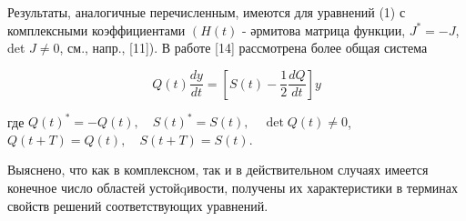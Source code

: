 \documentclass[10pt]{article}
\begin{document}
Результаты, аналогичные перечисленным, имеются для уравнений (1) с комплексными коэффициентами $\left(H(t)\right.$ - әрмитова матрица функции, $J^{*}=-J$, det $J \neq 0$, см., напр., [11]). В работе [14] рассмотрена более общая система



\[

Q(t) \frac{d y}{d t}=\left[S(t)-\frac{1}{2} \frac{d Q}{d t}\right] y

\]



где $Q(t)^{*}=-Q(t), \quad S(t)^{*}=S(t), \quad \operatorname{det} Q(t) \neq 0$, $Q(t+T)=Q(t), \quad S(t+T)=S(t)$.



Выяснено, что как в комплексном, так и в действительном случаях имеется конечное число областей устойqивости, получены их характеристики в терминах свойств решений соответствующих уравнений.
\end{document}
